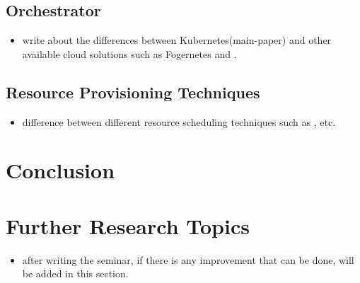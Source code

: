 \subsection{Orchestrator}
\label{sec:infra}
\begin{itemize}
  \item write about the differences between Kubernetes(main-paper)\cite{Santos2019} and other available cloud solutions such as Fogernetes\cite{Wobker2018} and \cite{Reale}.
\end{itemize}

\subsection{Resource Provisioning Techniques}
\begin{itemize}
  \item difference between different resource scheduling techniques such  as \cite{Bittencourt2017}, \cite{Haja2019} etc.
\end{itemize}

\section{Conclusion}
\label{sec:concl}

\section{Further Research Topics}
\label{sec:research}
\begin{itemize}
  \item after writing the seminar, if there is any improvement that can be done, will be added in this section.
\end{itemize}
